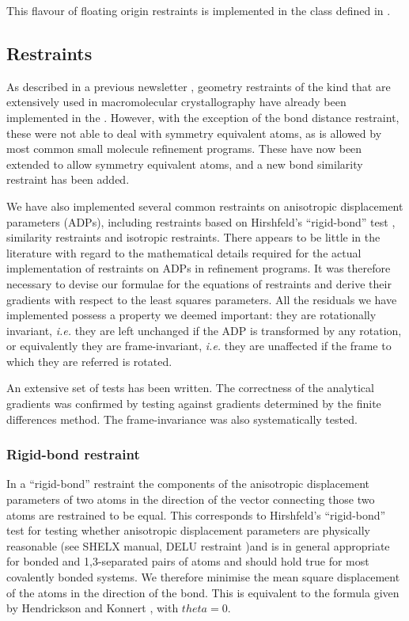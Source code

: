 \documentclass[12pt]{article}
\begin{document}
This flavour of floating origin restraints is implemented in the \cpp class  defined in .
\subsection{Restraints}

As described in a previous \cctbx newsletter \cite{cctbxnews:2004b}, geometry restraints of the kind that are extensively used in macromolecular crystallography have already been implemented in the \cctbx.  However, with the exception of the bond distance restraint, these were not able to deal with symmetry equivalent atoms, as is allowed by most common small molecule refinement programs.  These have now been extended to allow symmetry equivalent atoms, and a new bond similarity restraint has been added.

We have also implemented several common restraints on anisotropic displacement parameters (ADPs), including restraints based on Hirshfeld's ``rigid-bond'' test \cite{Hirshfeld:1976}, similarity restraints and isotropic restraints.
There appears to be little in the literature with regard to the mathematical details required for the actual implementation of restraints on ADPs in refinement programs. It was therefore necessary to devise our formulae for the equations of restraints and derive their gradients with respect to the least squares parameters. All the residuals we have implemented possess a property we deemed important: they are rotationally invariant, \emph{i.e.} they are left unchanged if the ADP is transformed by any rotation, or equivalently they are frame-invariant, \emph{i.e.} they are unaffected if the frame to which they are referred is rotated.

An extensive set of tests has been written. The correctness of the analytical gradients was confirmed by testing against gradients determined by the finite differences method. The frame-invariance was also systematically tested.

\subsubsection{Rigid-bond restraint}

In a ``rigid-bond'' restraint the components of the anisotropic displacement parameters of two atoms in the direction of the vector connecting those two atoms are restrained to be equal. This corresponds to Hirshfeld's ``rigid-bond'' test \cite{Hirshfeld:1976} for testing whether anisotropic displacement parameters are physically reasonable (see SHELX manual, DELU restraint \cite{SHELX:man97})and is in general appropriate for bonded and 1,3-separated pairs of atoms and should hold true for most covalently bonded systems. We therefore minimise the mean square displacement of the atoms in the direction of the bond. This is equivalent to the formula given by Hendrickson and Konnert \cite{Hendrickson:1980}, with $theta=0$.
\end{document}

